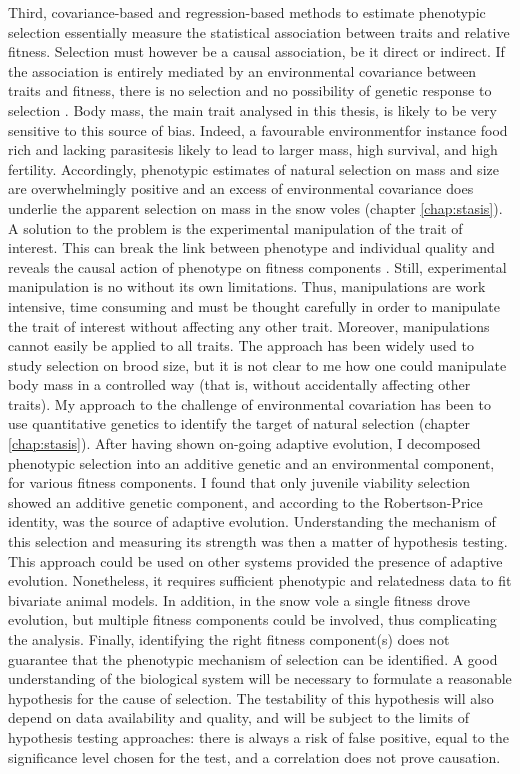 Third, covariance-based and regression-based methods to estimate phenotypic selection essentially measure the statistical association between traits and relative fitness. Selection must however be a causal association, be it direct or indirect. If the association is entirely mediated by an environmental covariance between traits and fitness, there is no selection and no possibility of genetic response to selection \parencite{Price1989, Rausher1992}. 
Body mass, the main trait analysed in this thesis, is likely to be very sensitive to this source of bias. Indeed, a favourable environment\textemdash for instance food rich and lacking parasites\textemdash is likely to lead to larger mass, high survival, and high fertility. Accordingly, phenotypic estimates of natural selection on mass and size are overwhelmingly positive \parencite{Blanckenhorn2000, Kingsolver2012} and an excess of environmental covariance does underlie the apparent selection on mass in the snow voles (chapter \ref{chap:stasis}).
A solution to the problem is the experimental manipulation of the trait of interest. This can break the link between phenotype and individual quality and reveals the causal action of phenotype on fitness components \parencite[e.g.][]{Tinbergen2004, Tschirren2006}. Still, experimental manipulation is no without its own limitations.
Thus, manipulations are work intensive, time consuming and must be thought carefully in order to manipulate the trait of interest without affecting any other trait. Moreover, manipulations cannot easily be applied to all traits. The approach has been widely used to study selection on brood size, but it is not clear to me how one could manipulate body mass in a controlled way (that is, without accidentally affecting other traits).
My approach to the challenge of environmental covariation has been to use quantitative genetics to identify the target of natural selection (chapter \ref{chap:stasis}). After having shown on-going adaptive evolution, I decomposed phenotypic selection into an additive genetic and an environmental component, for various fitness components. I found that only juvenile viability selection showed an additive genetic component, and according to the Robertson-Price identity, was the source of adaptive evolution. Understanding the mechanism of this selection and measuring its strength was then a matter of hypothesis testing.
This approach could be used on other systems provided the presence of adaptive evolution. Nonetheless, it requires sufficient phenotypic and relatedness data to fit bivariate animal models. In addition, in the snow vole a single fitness drove evolution, but multiple fitness components could be involved, thus complicating the analysis. Finally, identifying the right fitness component(s) does not guarantee that the phenotypic mechanism of selection can be identified. A good understanding of the biological system will be necessary to formulate a reasonable hypothesis for the cause of selection. The testability of this hypothesis will also depend on data availability and quality, and will be subject to the limits of hypothesis testing approaches: there is always a risk of false positive, equal to the significance level chosen for the test, and a correlation does not prove causation.


